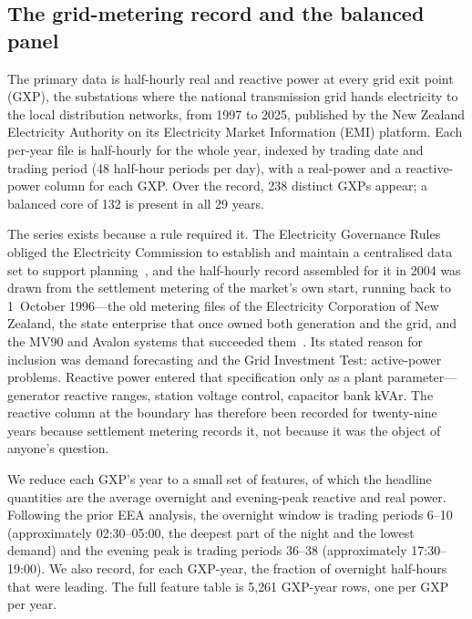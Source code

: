 \documentclass[journal]{IEEEtran}
\begin{document}
\subsection{The grid-metering record and the balanced panel}
The primary data is half-hourly real and reactive power at every grid exit point
(GXP), the substations where the national transmission grid hands electricity to
the local distribution networks, from 1997 to 2025, published by the New Zealand
Electricity Authority on its Electricity Market Information (EMI) platform. Each per-year
file is half-hourly for the whole year, indexed by trading date and trading
period (48 half-hour periods per day), with a real-power and a reactive-power
column for each GXP. Over the record, 238 distinct GXPs appear; a balanced core of
132 is present in all 29 years.

The series exists because a rule required it. The Electricity Governance Rules
obliged the Electricity Commission to establish and maintain a centralised data
set to support planning~\cite{egr_partf_r11}, and the half-hourly record
assembled for it in 2004 was drawn from the settlement metering of the market's
own start, running back to 1~October 1996---the old metering files of the
Electricity Corporation of New Zealand, the state enterprise that once owned
both generation and the grid, and the MV90 and Avalon systems that succeeded
them~\cite{ec_cds2004}. Its stated reason for inclusion was demand forecasting
and the Grid Investment Test: active-power problems. Reactive power entered that
specification only as a plant parameter---generator reactive ranges, station
voltage control, capacitor bank kVAr. The reactive column at the boundary has
therefore been recorded for twenty-nine years because settlement metering
records it, not because it was the object of anyone's question.

We reduce each GXP's year to a small set of features, of which the headline
quantities are the average overnight and evening-peak reactive and real power.
Following the prior EEA analysis, the overnight window is trading periods 6--10
(approximately 02:30--05:00, the deepest part of the night and the lowest demand)
and the evening peak is trading periods 36--38 (approximately 17:30--19:00). We
also record, for each GXP-year, the fraction of overnight half-hours that were
leading. The full feature table is 5{,}261 GXP-year rows, one per GXP per year.
\end{document}
